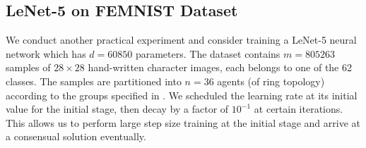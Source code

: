 \documentclass[10pt]{article} %
\theoremstyle{plain}
\theoremstyle{definition}
\theoremstyle{remark}
\begin{document}
\subsection{LeNet-5 on FEMNIST Dataset}
We conduct another practical experiment and consider training a LeNet-5 neural network which has $d=60850$ parameters. The dataset contains $m=805263$ samples of $28 \times 28$ hand-written character images, each belongs to one of the 62 classes. The samples are partitioned into $n=36$ agents (of ring topology) according to the groups specified in \citep{caldas2019leaf}.
We scheduled the learning rate at its initial value for the initial stage, then decay by a factor of $10^{-1}$ at certain iterations. This allows us to perform large step size training at the initial stage and arrive at a consensual solution eventually.

\end{document}
